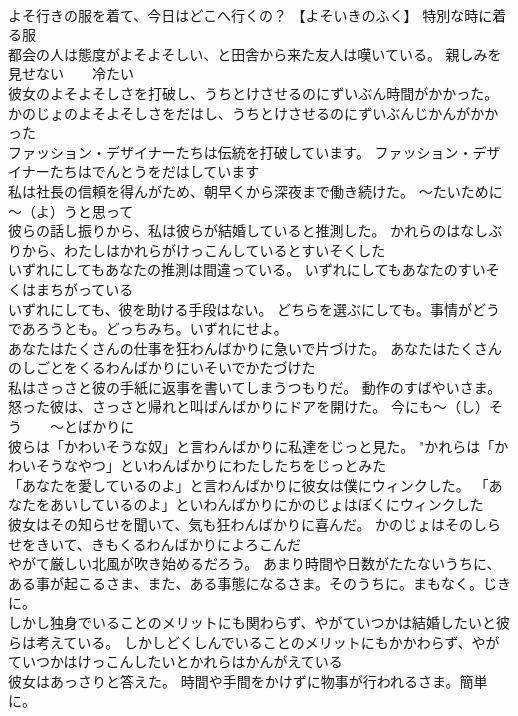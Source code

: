 \documentclass[8pt]{extreport}
\begin{document}
\begin{CJK}{UTF8}{min}
\\	よそ行きの服を着て、今日はどこへ行くの？	【よそいきのふく】 特別な時に着る服
\\	都会の人は態度がよそよそしい、と田舎から来た友人は嘆いている。	親しみを見せない　　冷たい
\\	彼女のよそよそしさを打破し、うちとけさせるのにずいぶん時間がかかった。	かのじょのよそよそしさをだはし、うちとけさせるのにずいぶんじかんがかかった 
\\	ファッション・デザイナーたちは伝統を打破しています。	ファッション・デザイナーたちはでんとうをだはしています 
\\	私は社長の信頼を得んがため、朝早くから深夜まで働き続けた。	～たいために　　～（よ）うと思って
\\	彼らの話し振りから、私は彼らが結婚していると推測した。	かれらのはなしぶりから、わたしはかれらがけっこんしているとすいそくした 
\\	いずれにしてもあなたの推測は間違っている。	いずれにしてもあなたのすいそくはまちがっている 
\\	いずれにしても、彼を助ける手段はない。	どちらを選ぶにしても。事情がどうであろうとも。どっちみち。いずれにせよ。
\\	あなたはたくさんの仕事を狂わんばかりに急いで片づけた。	あなたはたくさんのしごとをくるわんばかりにいそいでかたづけた 
\\	私はさっさと彼の手紙に返事を書いてしまうつもりだ。	動作のすばやいさま。
\\	怒った彼は、さっさと帰れと叫ばんばかりにドアを開けた。	今にも～（し）そう　　～とばかりに
\\	彼らは「かわいそうな奴」と言わんばかりに私達をじっと見た。	"かれらは「かわいそうなやつ」といわんばかりにわたしたちをじっとみた 
\\	「あなたを愛しているのよ」と言わんばかりに彼女は僕にウィンクした。	「あなたをあいしているのよ」といわんばかりにかのじょはぼくにウィンクした 
\\	彼女はその知らせを聞いて、気も狂わんばかりに喜んだ。	かのじょはそのしらせをきいて、きもくるわんばかりによろこんだ 
\\	やがて厳しい北風が吹き始めるだろう。	あまり時間や日数がたたないうちに、ある事が起こるさま、また、ある事態になるさま。そのうちに。まもなく。じきに。
\\	しかし独身でいることのメリットにも関わらず、やがていつかは結婚したいと彼らは考えている。	しかしどくしんでいることのメリットにもかかわらず、やがていつかはけっこんしたいとかれらはかんがえている 
\\	彼女はあっさりと答えた。	時間や手間をかけずに物事が行われるさま。簡単に。

\end{CJK}
\end{document}
